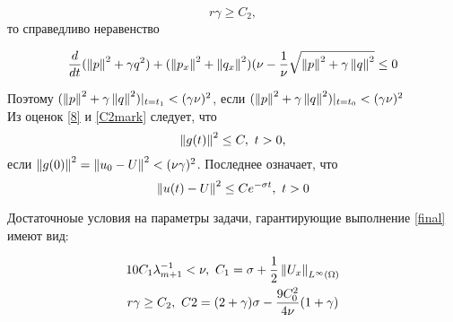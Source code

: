 \begin{equation}
    r\gamma \ge C_2,
\end{equation}
то справедливо неравенство

\begin{equation}\label{C2mark}
    \frac{d}{dt}(\left\lVert p\right\rVert^2 + \gamma{q}^2) + (\left\lVert p_x\right\rVert^2 + \left\lVert q_x\right\rVert^2)(\nu -
    \frac{1}{\nu}\sqrt{\left\lVert p\right\rVert^2+ \gamma \left\lVert q\right\rVert^2} \le 0
\end{equation}

Поэтому $(\left\lVert p\right\rVert^2 + \gamma \left\lVert q\right\rVert^2)|_{t=t_1} < (\gamma \nu)^2$, если
$(\left\lVert p\right\rVert^2 + \gamma \left\lVert q\right\rVert^2)|_{t=t_0} < (\gamma \nu)^2$\\

Из оценок \eqref{8} и \eqref{C2mark} следует, что 
\begin{equation}
    \left\lVert g(t)\right\rVert^2 \le C, \ t > 0,
\end{equation}
если $\left\lVert g(0)\right\rVert^2 = \left\lVert u_0 - U\right\rVert^2 < (\nu \gamma)^2$. Последнее означает,
что 
\begin{equation}\label{final}
    \left\lVert u(t) - U\right\rVert^2 \le C e^{-\sigma t}, \ t > 0
\end{equation}

Достаточноые условия на параметры задачи, гарантирующие выполнение \eqref{final}
имеют вид:

\begin{gather*}
    10C_1 \lambda_{m + 1}^{-1} < \nu, \ C_1 = \sigma + \frac{1}{2}
    \left\lVert U_x\right\rVert_{L^{\infty}(\Omega)} \\*
    r\gamma \ge C_2, \ C2 = (2 + \gamma)\sigma - \frac{9C_0^2}{4\nu}(1 + \gamma)
\end{gather*}
